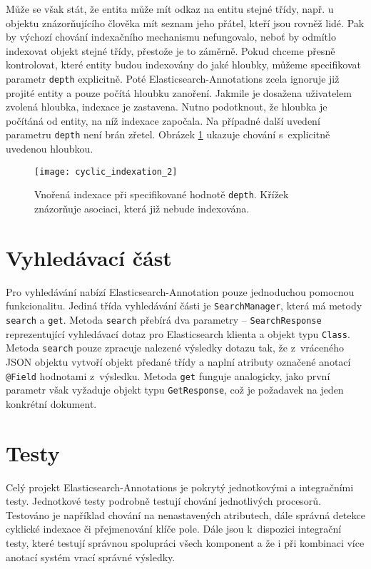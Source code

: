 \documentclass[11pt,oneside]{fithesis2}
\begin{document}
Může se však stát, že entita může mít odkaz na entitu stejné třídy, např. u objektu znázorňujícího člověka mít seznam jeho přátel, kteří jsou rovněž lidé. Pak by výchozí chování indexačního mechanismu nefungovalo, neboť by odmítlo indexovat objekt stejné třídy, přestože je to záměrně. Pokud chceme přesně kontrolovat, které entity budou indexovány do jaké hloubky, můžeme specifikovat parametr \texttt{depth} explicitně. Poté Elasticsearch-Annotations zcela ignoruje již projité entity a pouze počítá hloubku zanoření. Jakmile je dosažena uživatelem zvolená hloubka, indexace je zastavena. Nutno podotknout, že hloubka je počítáná od entity, na níž indexace započala. Na případné další uvedení parametru \texttt{depth}  není brán zřetel. Obrázek \ref{CyclicIndexation2} ukazuje chování s~explicitně uvedenou hloubkou.

\begin{figure}[htb]
	\begin{center}
		\texttt{[image: cyclic\_indexation\_2]}
	\end{center}
	\caption{Vnořená indexace při specifikované hodnotě \texttt{depth}.  Křížek znázorňuje asociaci, která již nebude indexována.}	
	\label{CyclicIndexation2}
\end{figure}

\section{Vyhledávací část}
Pro vyhledávání nabízí Elasticsearch-Annotation pouze jednoduchou pomocnou funkcionalitu. Jediná třída vyhledávání části je \texttt{SearchManager}, která má metody \texttt{search} a \texttt{get}. Metoda \texttt{search} přebírá dva parametry -- \texttt{SearchResponse} reprezentující vyhledávací dotaz pro Elasticsearch klienta a objekt typu \texttt{Class}. Metoda \texttt{search} pouze zpracuje nalezené výsledky dotazu tak, že z~vráceného JSON objektu vytvoří objekt předané třídy a naplní atributy označené anotací \texttt{@Field} hodnotami z~výsledku. Metoda \texttt{get} funguje analogicky, jako první parametr však vyžaduje objekt typu \texttt{GetResponse}, což je požadavek na jeden konkrétní dokument.

\section{Testy}
Celý projekt Elasticsearch-Annotations je pokrytý jednotkovými a integračními testy. Jednotkové testy podrobně testují chování jednotlivých procesorů. Testováno je například chování na nenastavených atributech, dále správná detekce cyklické indexace či přejmenování klíče pole. Dále jsou k~dispozici integrační testy, které testují správnou spolupráci všech komponent a že i při kombinaci více anotací systém vrací správné výsledky. 
\end{document}
